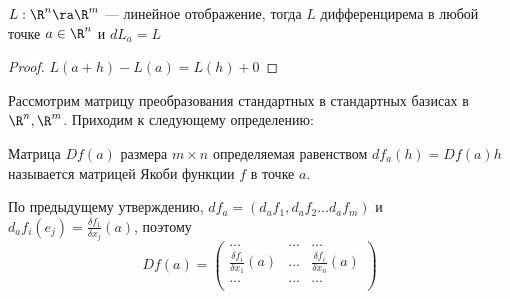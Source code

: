 \begin{example}
    \(L: \R^n \ra \R^m\) --- линейное отображение, тогда \(L\) дифференцирема в любой точке \(a \in \R^n\) и \(dL_a = L\)
\end{example}
\begin{proof}
    \(L(a + h) - L(a) = L(h) + 0\)
\end{proof}

Рассмотрим матрицу преобразования стандартных в стандартных базисах в \(\R^n, \R^m\). Приходим к следующему определению:
\begin{definition}
    Матрица \(Df(a)\) размера \(m\times n\) определяемая равенством \(df_a(h) = Df(a)h\) называется матрицей Якоби функции \(f\) в точке \(a\).
\end{definition}

\begin{note}
    По предыдущему утверждению, \(df_a = (d_af_1, d_af_2\dots d_af_m)\) и \(d_af_i(e_j) = \frac{\delta f_1}{\delta x_j}(a)\), поэтому 
    \[Df(a) = \left(\begin{array}{lll}
        \dots & \dots & \dots \\
        \frac{\delta f_i}{\delta x_1}(a) & \dots & \frac{\delta f_i}{\delta x_n}(a) \\
        \dots & \dots & \dots \\
    \end{array}\right)\]
\end{note}